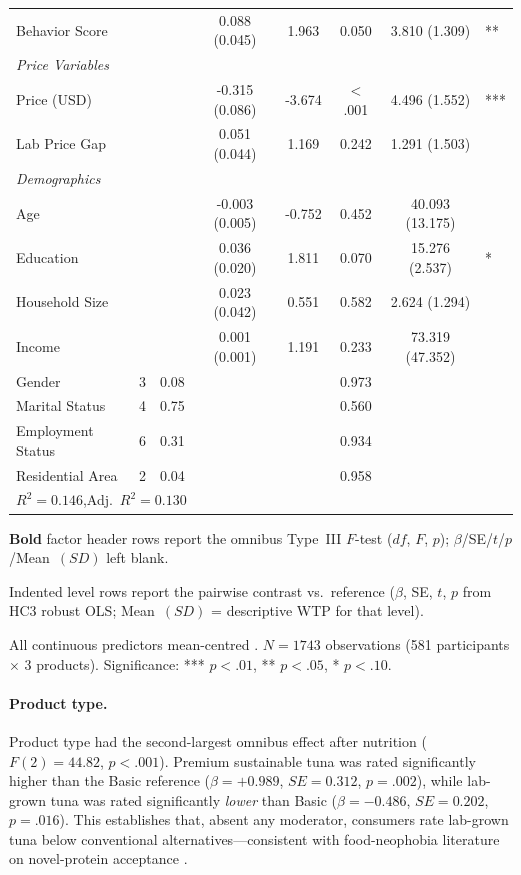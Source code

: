 \begin{table}[ht]
\begin{threeparttable}
\begin{tabular}{lccccccl}
\quad Behavior Score & & & 0.088 (0.045) & 1.963 & 0.050 & 3.810 (1.309) & ** \\
\multicolumn{8}{l}{\textit{Price Variables}} \\
\quad Price (USD) & & & -0.315 (0.086) & -3.674 & $<$.001 & 4.496 (1.552) & *** \\
\quad Lab Price Gap & & & 0.051 (0.044) & 1.169 & 0.242 & 1.291 (1.503) &  \\
\multicolumn{8}{l}{\textit{Demographics}} \\
\quad Age & & & -0.003 (0.005) & -0.752 & 0.452 & 40.093 (13.175) &  \\
\quad Education & & & 0.036 (0.020) & 1.811 & 0.070 & 15.276 (2.537) & * \\
\quad Household Size & & & 0.023 (0.042) & 0.551 & 0.582 & 2.624 (1.294) &  \\
\quad Income & & & 0.001 (0.001) & 1.191 & 0.233 & 73.319 (47.352) &  \\
\quad Gender & 3 & 0.08 & & & 0.973 & &  \\
\quad Marital Status & 4 & 0.75 & & & 0.560 & &  \\
\quad Employment Status & 6 & 0.31 & & & 0.934 & &  \\
\quad Residential Area & 2 & 0.04 & & & 0.958 & &  \\
\midrule
\multicolumn{8}{l}{$R^2 = 0.146$,\quad Adj.\ $R^2 = 0.130$} \\
\bottomrule
\end{tabular}
\begin{tablenotes}\footnotesize
\item \textbf{Bold} factor header rows report the omnibus Type~III $F$-test ($df$, $F$, $p$); $\beta$/SE/$t$/$p$/Mean~$(SD)$ left blank.
\item Indented level rows report the pairwise contrast vs.\ reference ($\beta$, SE, $t$, $p$ from HC3 robust OLS; Mean~$(SD)$ = descriptive WTP for that level).
\item All continuous predictors mean-centred \citep{jaccard2003}. $N=1743$ observations (581 participants $\times$ 3 products). Significance: *** $p<.01$, ** $p<.05$, * $p<.10$.
\end{tablenotes}
\end{threeparttable}
\end{table}

\paragraph{Product type.} Product type had the second-largest omnibus effect after nutrition ($F(2)=44.82$, $p<.001$). Premium sustainable tuna was rated significantly higher than the Basic reference ($\beta=+0.989$, $SE=0.312$, $p=.002$), while lab-grown tuna was rated significantly \textit{lower} than Basic ($\beta=-0.486$, $SE=0.202$, $p=.016$). This establishes that, absent any moderator, consumers rate lab-grown tuna below conventional alternatives---consistent with food-neophobia literature on novel-protein acceptance \citep{siegrist2020}.

